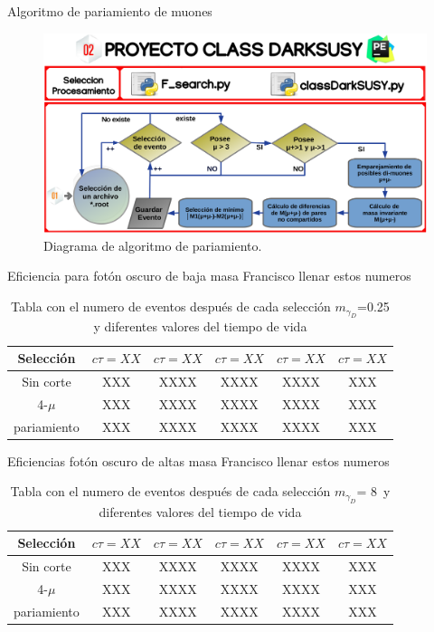 \begin{frame}{Algoritmo de pariamiento de muones}
\begin{figure}[h]
\centering
\includegraphics[width=1\textwidth]{Imag/class_darksusy.png}
\caption{Diagrama de algoritmo de pariamiento.}
\end{figure}   
\end{frame}

\begin{frame}{Eficiencia para fot\'on oscuro de baja masa}
\color{red} Francisco llenar estos numeros \color{black}
\begin{table}[]
    \centering
    \begin{tabular}{c|c|c|c|c|c|}
Selecci\'on  & $c\tau=XX$ & $c\tau=XX$ & $c\tau=XX$ & $c\tau=XX$ & $c\tau=XX$ \\  \hline
Sin corte         &  XXX & XXXX & XXXX & XXXX & XXX \\
4-$\mu$         &  XXX & XXXX & XXXX & XXXX & XXX \\
pariamiento    &  XXX & XXXX & XXXX & XXXX & XXX
     \end{tabular}
    \caption{Tabla con el numero de eventos despu\'es de cada selecci\'on $m_{\gamma_{D}}$=0.25 y diferentes valores del tiempo de vida}
    \label{tab:my_label}
\end{table}
    
\end{frame}

\begin{frame}{Eficiencias fot\'on oscuro de altas masa}
\color{red} Francisco llenar estos numeros \color{black}

\begin{table}[]
    \centering
    \begin{tabular}{c|c|c|c|c|c|}
Selecci\'on  & $c\tau=XX$ & $c\tau=XX$ & $c\tau=XX$ & $c\tau=XX$ & $c\tau=XX$ \\ \hline
Sin corte         &  XXX & XXXX & XXXX & XXXX & XXX \\
4-$\mu$         &  XXX & XXXX & XXXX & XXXX & XXX \\
pariamiento    &  XXX & XXXX & XXXX & XXXX & XXX
     \end{tabular}
    \caption{Tabla con el numero de eventos despu\'es de cada selecci\'on $m_{\gamma_{D}}$= 8~\GeV y diferentes valores del tiempo de vida}
    \label{tab:my_label}
\end{table}
    
\end{frame}


